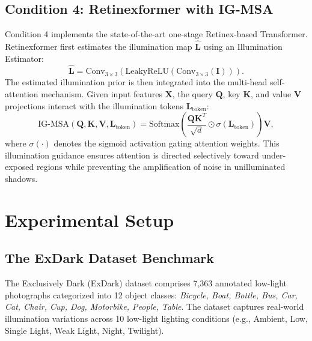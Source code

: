 \documentclass[conference]{IEEEtran}
\begin{document}
\subsection{Condition 4: Retinexformer with IG-MSA}
Condition 4 implements the state-of-the-art one-stage Retinex-based Transformer. Retinexformer first estimates the illumination map $\hat{\mathbf{L}}$ using an Illumination Estimator:
\begin{equation}
\hat{\mathbf{L}} = \text{Conv}_{3\times 3}\left(\text{LeakyReLU}\left(\text{Conv}_{3\times 3}(\mathbf{I})\right)\right).
\end{equation}
The estimated illumination prior is then integrated into the multi-head self-attention mechanism. Given input features $\mathbf{X}$, the query $\mathbf{Q}$, key $\mathbf{K}$, and value $\mathbf{V}$ projections interact with the illumination tokens $\mathbf{L}_{\text{token}}$:
\begin{equation}
\text{IG-MSA}(\mathbf{Q}, \mathbf{K}, \mathbf{V}, \mathbf{L}_{\text{token}}) = \text{Softmax}\left(\frac{\mathbf{Q}\mathbf{K}^T}{\sqrt{d}} \odot \sigma(\mathbf{L}_{\text{token}})\right) \mathbf{V},
\label{eq:igmsa}
\end{equation}
where $\sigma(\cdot)$ denotes the sigmoid activation gating attention weights. This illumination guidance ensures attention is directed selectively toward under-exposed regions while preventing the amplification of noise in unilluminated shadows.

\section{Experimental Setup}

\subsection{The ExDark Dataset Benchmark}
The Exclusively Dark (ExDark) dataset \cite{loh2019getting} comprises 7,363 annotated low-light photographs categorized into 12 object classes: \textit{Bicycle, Boat, Bottle, Bus, Car, Cat, Chair, Cup, Dog, Motorbike, People, Table}. The dataset captures real-world illumination variations across 10 low-light lighting conditions (e.g., Ambient, Low, Single Light, Weak Light, Night, Twilight).
\end{document}
